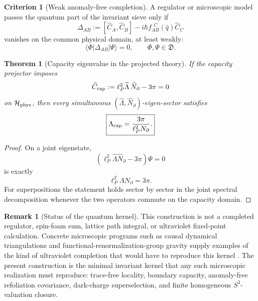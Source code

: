 \documentclass[aps,prd,reprint,nofootinbib,superscriptaddress]{revtex4-2}
\numberwithin{equation}{section}
\theoremstyle{definition}
\newtheorem{criterion}{Criterion}[section]
\newtheorem{remark}{Remark}[section]
\theoremstyle{plain}
\newtheorem{theorem}{Theorem}[section]
\newcommand{\Hphys}{\mathcal H_{\rm phys}}
\begin{document}
\begin{criterion}[Weak anomaly-free completion]\label{crit:weak-anomaly}
A regulator or microscopic model passes the quantum part of the invariant sieve only if
\begin{equation}
\Delta_{AB}
:=
[\widehat C_A,\widehat C_B]
-i\hbar f_{AB}^{\ \ C}(\widehat q)\widehat C_C
\end{equation}
vanishes on the common physical domain, at least weakly:
\begin{equation}
\langle\Phi|\Delta_{AB}|\Psi\rangle=0,
\qquad
\Phi,\Psi\in\mathfrak D.
\end{equation}
\end{criterion}

\begin{theorem}[Capacity eigenvalue in the projected theory]\label{thm:capacity-eigenvalue-quantum}
If the capacity projector imposes
\begin{equation}
\widehat C_{\rm cap}:=\ell_P^2\widehat\Lambda\,\widehat N_\partial-3\pi=0
\end{equation}
on \(\Hphys\), then every simultaneous \((\widehat\Lambda,\widehat N_\partial)\)-eigen-sector satisfies
\begin{equation}
\boxed{
\Lambda_{\rm cap}=\frac{3\pi}{\ell_P^2N_\partial}.
}
\end{equation}
\end{theorem}

\begin{proof}
On a joint eigenstate,
\[
(\ell_P^2\widehat\Lambda\widehat N_\partial-3\pi)\Psi=0
\]
is exactly
\[
\ell_P^2\Lambda N_\partial=3\pi.
\]
For superpositions the statement holds sector by sector in the joint spectral decomposition whenever the two operators commute on the capacity domain.
\end{proof}

\begin{remark}[Status of the quantum kernel]
This construction is not a completed regulator, spin-foam sum, lattice path integral, or ultraviolet fixed-point calculation.  Concrete microscopic programs such as causal dynamical triangulations and functional-renormalization-group gravity supply examples of the kind of ultraviolet completion that would have to reproduce this kernel \cite{Loll2020,Saueressig2023}.  The present construction is the minimal invariant kernel that any such microscopic realization must reproduce: trace-free locality, boundary capacity, anomaly-free refoliation covariance, dark-charge superselection, and finite homogeneous \(S^3\)-valuation closure.
\end{remark}
\end{document}
